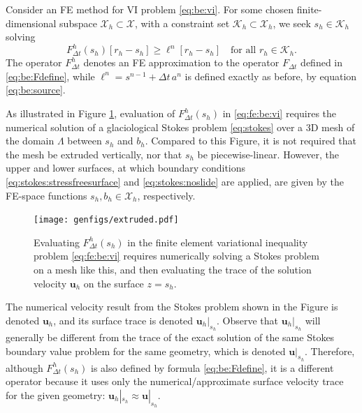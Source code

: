 \documentclass[hidelinks,onefignum,onetabnum,final]{siamart220329}  %
\newcommand{\bu}{\mathbf{u}}
\newcommand{\cK}{\mathcal{K}}
\newcommand{\cX}{\mathcal{X}}
\begin{document}
Consider an FE method for VI problem \eqref{eq:be:vi}.  For some chosen finite-dimensional subspace $\cX_h\subset \cX$, with a constraint set $\cK_h\subset \cX_h$, we seek $s_h\in\cK_h$ solving
\begin{equation}
F^h_{\Delta t}(s_h)[r_h-s_h] \ge \ell^n[r_h-s_h] \quad \text{for all } r_h \in \cK_h. \label{eq:fe:be:vi}
\end{equation}
The operator $F^h_{\Delta t}$ denotes an FE approximation to the operator $F_{\Delta t}$ defined in \eqref{eq:be:Fdefine}, while $\ell^n = s^{n-1} + \Delta t\,a^n$ is defined exactly as before, by equation \eqref{eq:be:source}.

As illustrated in Figure \ref{fig:fe:operatorvisualization}, evaluation of $F^h_{\Delta t}(s_h)$ in \eqref{eq:fe:be:vi} requires the numerical solution of a glaciological Stokes problem \eqref{eq:stokes} over a 3D mesh of the domain $\Lambda$ between $s_h$ and $b_h$.  Compared to this Figure, it is not required that the mesh be extruded vertically, nor that $s_h$ be piecewise-linear.  However, the upper and lower surfaces, at which boundary conditions \eqref{eq:stokes:stressfreesurface} and \eqref{eq:stokes:noslide} are applied, are given by the FE-space functions $s_h,b_h\in\cX_h$, respectively.

\begin{figure}[ht]
\begin{center}
\texttt{[image: genfigs/extruded.pdf]}
\end{center}
\caption{Evaluating $F^h_{\Delta t}(s_h)$ in the finite element variational inequality problem \eqref{eq:fe:be:vi} requires numerically solving a Stokes problem on a mesh like this, and then evaluating the trace of the solution velocity $\bu_h$ on the surface $z=s_h$.}
\label{fig:fe:operatorvisualization}
\end{figure}

The numerical velocity result from the Stokes problem shown in the Figure is denoted $\bu_h$, and its surface trace is denoted $\bu_h|_{s_h}$.  Observe that $\bu_h|_{s_h}$ will generally be different from the trace of the exact solution of the same Stokes boundary value problem for the same geometry, which is denoted $\bu|_{s_h}$.  Therefore, although $F^h_{\Delta t}(s_h)$ is also defined by formula \eqref{eq:be:Fdefine}, it is a different operator because it uses only the numerical/approximate surface velocity trace for the given geometry: $\bu_h|_{s_h} \approx \bu|_{s_h}$.
\end{document}

